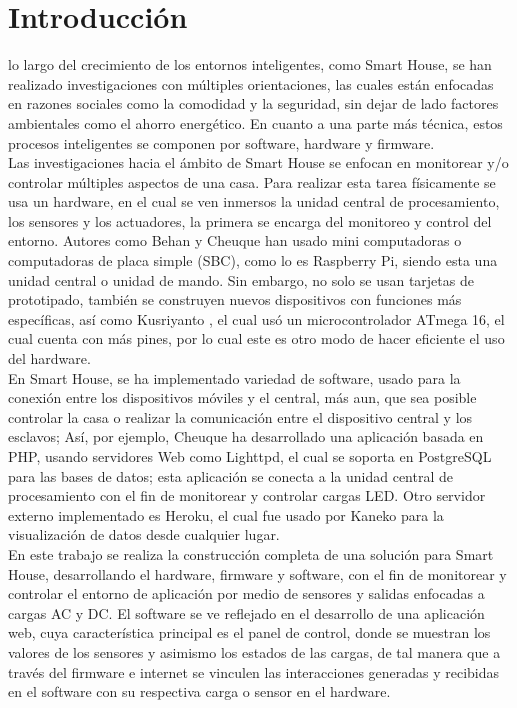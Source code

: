 \section{Introducción}

  lo largo del crecimiento de los entornos inteligentes, como Smart House, se han realizado investigaciones con múltiples orientaciones, las cuales están enfocadas en razones sociales como la comodidad y la seguridad, sin dejar de lado factores ambientales como el ahorro energético. En cuanto a una parte más técnica, estos procesos inteligentes se componen por software, hardware y firmware.\\ 
 
 Las investigaciones hacia el ámbito de Smart House se enfocan en monitorear y/o controlar múltiples aspectos de una casa. Para realizar esta tarea físicamente se usa un hardware, en el cual se ven inmersos la unidad central de procesamiento, los sensores y los actuadores, la primera se encarga del monitoreo y control del entorno. Autores como Behan \cite{Behan2013} y Cheuque \cite{Cheuque2015} han usado mini computadoras o computadoras de placa simple (SBC), como lo es Raspberry Pi, siendo esta una unidad central o unidad de mando. Sin embargo, no solo se usan tarjetas de prototipado, también se construyen nuevos dispositivos con funciones más específicas, así como Kusriyanto \cite{Kusriyanto2015}, el cual usó un microcontrolador ATmega 16, el cual cuenta con más pines, por lo cual este es otro modo de hacer eficiente el uso del hardware.\\ 
 
 En Smart House, se ha implementado variedad de software, usado para la conexión entre los dispositivos móviles y el central, más aun, que sea posible controlar la casa o realizar la comunicación entre el dispositivo central y los esclavos; Así, por ejemplo, Cheuque \cite{Cheuque2015} ha desarrollado una aplicación basada en PHP, usando servidores Web como Lighttpd, el cual se soporta en PostgreSQL para las bases de datos; esta aplicación se conecta a la unidad central de procesamiento con el fin de monitorear y controlar cargas LED. Otro servidor externo implementado es Heroku, el cual fue usado por Kaneko \cite{Kaneko2017} para la visualización de datos desde cualquier lugar.\\ 
 
 En este trabajo se realiza la construcción completa de una solución para Smart House, desarrollando el hardware, firmware y software, con el fin de monitorear y controlar el entorno de aplicación por medio de sensores y salidas enfocadas a cargas AC y DC. El software se ve reflejado en el desarrollo de una aplicación web, cuya característica principal es el panel de control, donde se muestran los valores de los sensores y asimismo los estados de las cargas, de tal manera que a través del firmware e internet se vinculen las interacciones generadas y recibidas en el software con su respectiva carga o sensor en el hardware.\\ 
 
